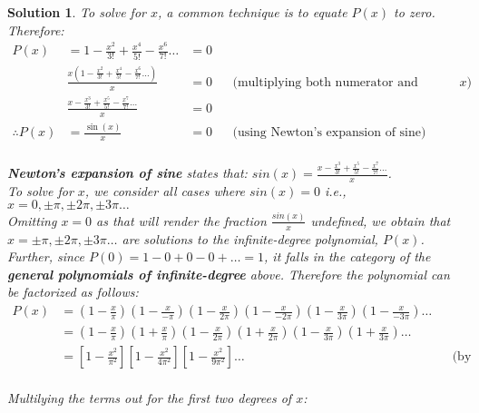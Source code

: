\documentclass{article}
\newtheorem*{solution*}{Solution}
\begin{document}
\begin{solution*}
    To solve for $x$, a common technique is to equate 
    $P(x)$ to zero. Therefore:\\
    
    \begin{align*}
        P(x) &= 1-\frac{x^2}{3!}+\frac{x^4}{5!}-\frac{x^6}{7!}\dots &= 0\\
        & \frac{x(1-\frac{x^2}{3!}+\frac{x^4}{5!}-\frac{x^6}{7!}\dots)}{x} &= 0
        && \text{(multiplying both numerator and denominator by } x)\\
        & \frac{x-\frac{x^3}{3!}+\frac{x^5}{5!}-\frac{x^7}{7!}\dots}{x} &= 0\\
        \therefore P(x) &= \frac{\sin(x)}{x} &= 0
        && \text{(using Newton's expansion of sine)}\\
    \end{align*}

    \textbf{Newton's expansion of sine} states that:
    $sin(x) = \frac{x-\frac{x^3}{3!}+\frac{x^5}{5!}-\frac{x^7}{7!}\dots}{x}$.\\
    
    To solve for $x$, we consider all cases where $sin(x)=0$
    i.e., $x=0, \pm\pi, \pm2\pi, \pm3\pi\dots$\\

    Omitting $x=0$ as that will render the fraction 
    $\frac{sin(x)}{x}$ undefined, we obtain that $x=\pm\pi, \pm2\pi, \pm3\pi\dots$
    are solutions to the infinite-degree polynomial, $P(x)$.\\

    Further, since $P(0)=1-0+0-0+\dots=1$, 
    it falls in the category of the \textbf{general polynomials of infinite-degree} above.
    Therefore the polynomial can be factorized as follows:\\

    \begin{align*}
        P(x) &= (1-\frac{x}{\pi})(1-\frac{x}{-\pi})
        (1-\frac{x}{2\pi})(1-\frac{x}{-2\pi})
        (1-\frac{x}{3\pi})(1-\frac{x}{-3\pi})\dots\\
        &= (1-\frac{x}{\pi})(1+\frac{x}{\pi})
        (1-\frac{x}{2\pi})(1+\frac{x}{2\pi})
        (1-\frac{x}{3\pi})(1+\frac{x}{3\pi})\dots\\
        &= [1-\frac{x^2}{\pi^2}]
        [1-\frac{x^2}{4\pi^2}]
        [1-\frac{x^2}{9\pi^2}]\dots
        &&\text{(by multilying the terms in pairs)}\\
    \end{align*}    

    Multilying the terms out for the first two degrees of $x$:\\


\end{solution*}
\end{document}
